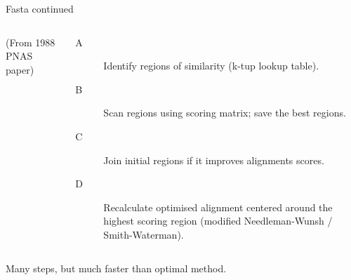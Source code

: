 \documentclass[pdf]{beamer}
\begin{document}
\begin{frame}{Fasta continued}
\begin{columns}
\begin{column}{0.5\textwidth}
      {\tiny (From 1988 PNAS paper)}
    \end{column}
    \begin{column}{0.6\textwidth}
      {\footnotesize
      \begin{description}
      \item[A] Identify regions of similarity (k-tup lookup table).
      \item[B] Scan regions using scoring matrix; save the best regions.
      \item[C] Join initial regions if it improves alignments scores.
      \item[D] Recalculate optimised alignment centered around the highest
        scoring region (modified Needleman-Wunsh / Smith-Waterman).
      \end{description}
      }
    \end{column}
  \end{columns}
  {\tiny Many steps, but much faster than optimal method.}
\end{frame}
\end{document}
